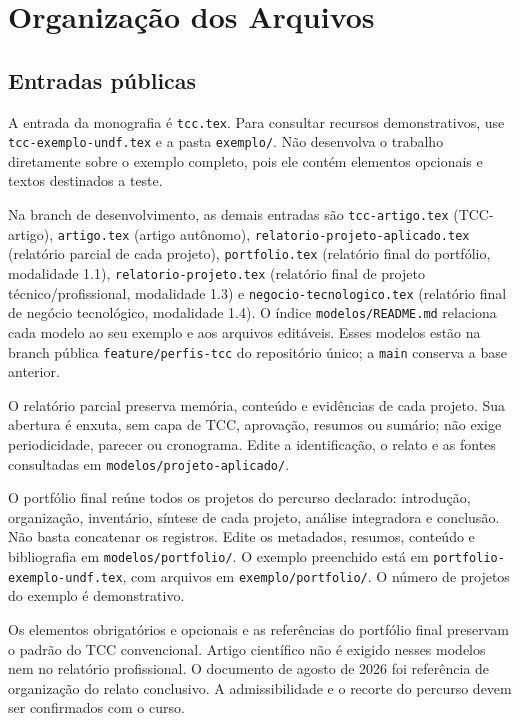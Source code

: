 \chapter{Organização dos Arquivos}

\section{Entradas públicas}

A entrada da monografia é \texttt{tcc.tex}. Para consultar recursos demonstrativos,
use \texttt{tcc-exemplo-undf.tex} e a pasta \texttt{exemplo/}. Não desenvolva o
trabalho diretamente sobre o exemplo completo, pois ele contém elementos
opcionais e textos destinados a teste.

Na branch de desenvolvimento, as demais entradas são \texttt{tcc-artigo.tex}
(TCC-artigo), \texttt{artigo.tex} (artigo autônomo),
\texttt{relatorio-projeto-aplicado.tex} (relatório parcial de cada projeto),
\texttt{portfolio.tex} (relatório final do portfólio, modalidade 1.1),
\texttt{relatorio-projeto.tex}
(relatório final de projeto técnico/profissional, modalidade 1.3) e
\texttt{negocio-tecnologico.tex} (relatório final de negócio tecnológico,
modalidade 1.4). O índice \texttt{modelos/README.md} relaciona cada modelo ao
seu exemplo e aos arquivos editáveis. Esses modelos estão na branch pública
\texttt{feature/perfis-tcc} do repositório único; a \texttt{main} conserva a base anterior.

O relatório parcial preserva memória, conteúdo e evidências de cada projeto.
Sua abertura é enxuta, sem capa de TCC, aprovação, resumos ou sumário; não
exige periodicidade, parecer ou cronograma. Edite a identificação, o relato
e as fontes consultadas em \texttt{modelos/projeto-aplicado/}.

O portfólio final reúne todos os projetos do percurso declarado: introdução,
organização, inventário, síntese de cada projeto, análise integradora e
conclusão. Não basta concatenar os registros. Edite os metadados, resumos,
conteúdo e bibliografia em \texttt{modelos/portfolio/}. O exemplo preenchido
está em \texttt{portfolio-exemplo-undf.tex}, com arquivos em
\texttt{exemplo/portfolio/}. O número de projetos do exemplo é demonstrativo.

Os elementos obrigatórios e opcionais e as referências do portfólio final
preservam o padrão do TCC convencional. Artigo científico não é exigido
nesses modelos nem no relatório profissional. O documento de agosto de 2026
foi referência de organização do relato conclusivo. A admissibilidade e o
recorte do percurso devem ser confirmados com o curso.

